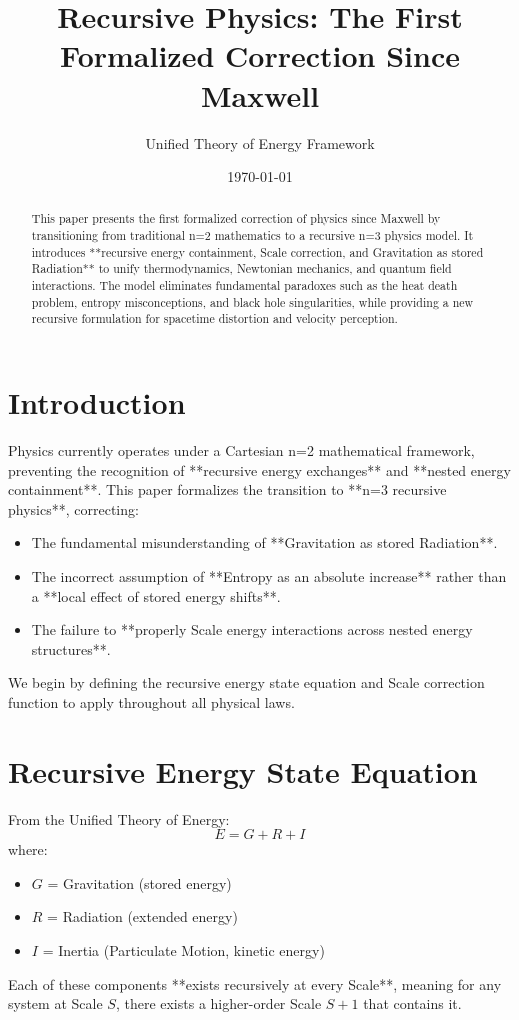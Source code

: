 \documentclass{article}
\title{Recursive Physics: The First Formalized Correction Since Maxwell}
\author{Unified Theory of Energy Framework}
\date{\today}
\begin{document}
\maketitle

\begin{abstract}
This paper presents the first formalized correction of physics since Maxwell by transitioning from traditional n=2 mathematics to a recursive n=3 physics model. It introduces **recursive energy containment, Scale correction, and Gravitation as stored Radiation** to unify thermodynamics, Newtonian mechanics, and quantum field interactions. The model eliminates fundamental paradoxes such as the heat death problem, entropy misconceptions, and black hole singularities, while providing a new recursive formulation for spacetime distortion and velocity perception.
\end{abstract}

\section{Introduction}
Physics currently operates under a Cartesian n=2 mathematical framework, preventing the recognition of **recursive energy exchanges** and **nested energy containment**. This paper formalizes the transition to **n=3 recursive physics**, correcting:
\begin{itemize}
    \item The fundamental misunderstanding of **Gravitation as stored Radiation**.
    \item The incorrect assumption of **Entropy as an absolute increase** rather than a **local effect of stored energy shifts**.
    \item The failure to **properly Scale energy interactions across nested energy structures**.
\end{itemize}
We begin by defining the recursive energy state equation and Scale correction function to apply throughout all physical laws.

\section{Recursive Energy State Equation}
From the Unified Theory of Energy:
\begin{equation}
E = G + R + I
\end{equation}
where:
\begin{itemize}
    \item $G$ = Gravitation (stored energy)
    \item $R$ = Radiation (extended energy)
    \item $I$ = Inertia (Particulate Motion, kinetic energy)
\end{itemize}
Each of these components **exists recursively at every Scale**, meaning for any system at Scale $S$, there exists a higher-order Scale $S+1$ that contains it.
\end{document}
